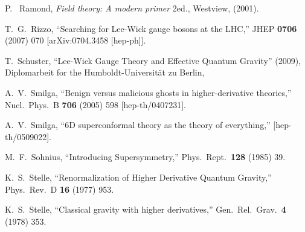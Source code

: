 \begin{thebibliography}{99}
P.~ Ramond, {\em Field theory: A modern primer} 2ed., Westview,
(2001).  
  
 
  T.~G.~Rizzo,
  ``Searching for Lee-Wick gauge bosons at the LHC,''
  JHEP {\bf 0706} (2007) 070
  [arXiv:0704.3458 [hep-ph]].





  T.~Schuster,
  ``Lee-Wick Gauge Theory and Effective Quantum Gravity'' (2009),
  Diplomarbeit for the Humboldt-Universit\"at zu Berlin, 



  A.~V.~Smilga,
  ``Benign versus malicious ghosts in higher-derivative theories,''
  Nucl.\ Phys.\ B {\bf 706} (2005) 598
  [hep-th/0407231].


  A.~V.~Smilga,
  ``6D superconformal theory as the theory of everything,''
  [hep-th/0509022].


  M.~F.~Sohnius,
  ``Introducing Supersymmetry,''
  Phys.\ Rept.\  {\bf 128} (1985) 39.
  
	


  K.~S.~Stelle,
  ``Renormalization of Higher Derivative Quantum Gravity,''
  Phys.\ Rev.\ D {\bf 16} (1977) 953.



  K.~S.~Stelle,
  ``Classical gravity with higher derivatives,''
  Gen.\ Rel.\ Grav.\ {\bf 4} (1978) 353.




\end{thebibliography}
